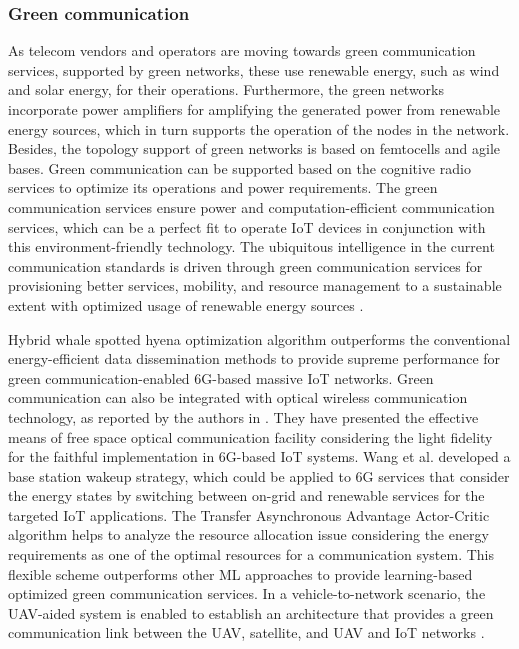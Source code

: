 \documentclass[journal]{IEEEtran}
\begin{document}
\subsubsection{Green communication} 
As telecom vendors and operators are moving towards green communication services, supported by green networks, these use renewable energy, such as wind and solar energy, for their operations. Furthermore, the green networks incorporate power amplifiers for amplifying the generated power from renewable energy sources, which in turn supports the operation of the nodes in the network. Besides, the topology support of green networks is based on femtocells and agile bases. Green communication can be supported based on the cognitive radio services to optimize its operations and power requirements. The green communication services ensure power and computation-efficient communication services, which can be a perfect fit to operate IoT devices in conjunction with this environment-friendly technology. The ubiquitous intelligence in the current communication standards is driven through green communication services for provisioning better services, mobility, and resource management to a sustainable extent with optimized usage of renewable energy sources \cite{niu2020green,Yang2022Energy}. 

Hybrid whale spotted hyena optimization algorithm \cite{verma2020towards} outperforms the conventional energy-efficient data dissemination methods to provide supreme performance for green communication-enabled 6G-based massive IoT networks. Green communication can also be integrated with optical wireless communication technology, as reported by the authors in \cite{chowdhury2019role}. They have presented the effective means of free space optical communication facility considering the light fidelity for the faithful implementation in 6G-based IoT systems. Wang et al. \cite{wang2020base} developed a base station wakeup strategy, which could be applied to 6G services that consider the energy states by switching between on-grid and renewable services for the targeted IoT applications. The Transfer Asynchronous Advantage Actor-Critic algorithm \cite{zhang2021learning} helps to analyze the resource allocation issue considering the energy requirements as one of the optimal resources for a communication system. This flexible scheme outperforms other ML approaches to provide learning-based optimized green communication services. In a vehicle-to-network scenario, the UAV-aided system is enabled to establish an architecture that provides a green communication link between the UAV, satellite, and UAV and IoT networks \cite{dai2020uav}. 
\end{document}

